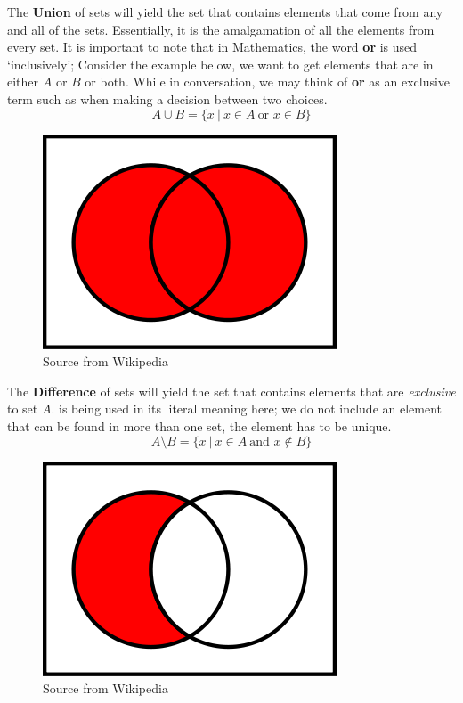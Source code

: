 \documentclass[../setup.tex]{subfiles}
\begin{document}
\begin{theorem}
The \textbf{Union} of sets will yield the set that contains elements that come from any and all of the sets. Essentially, it is the amalgamation of all the elements from every set. It is important to note that in Mathematics, the word \textbf{or} is used `inclusively'; Consider the example below, we want to get elements that are in either $A$ or $B$ or both. While in conversation, we may think of \textbf{or} as an exclusive term such as when making a decision between two choices.
\[A\cup B = \{x\ |\ x\in A\ \text{or } x\in B \}\]
\begin{figure}[H]
    \centering
    \includegraphics[scale=0.6]{Venn Diagram-Union.png}
    \caption{Source from Wikipedia}
\end{figure}
\end{theorem}



\begin{theorem}
The \textbf{Difference} of sets will yield the set that contains elements that are \textit{exclusive} to set $A$.  is being used in its literal meaning here; we do not include an element that can be found in more than one set, the element has to be unique.   
\[A\setminus B = \{x\ |\ x\in A\ \text{and } x\notin B \}\]
\begin{figure}[H]
    \centering
    \includegraphics[scale=0.6]{Venn Diagram-Difference.png}
    \caption{Source from Wikipedia}
\end{figure}
\end{theorem}
\end{document}
